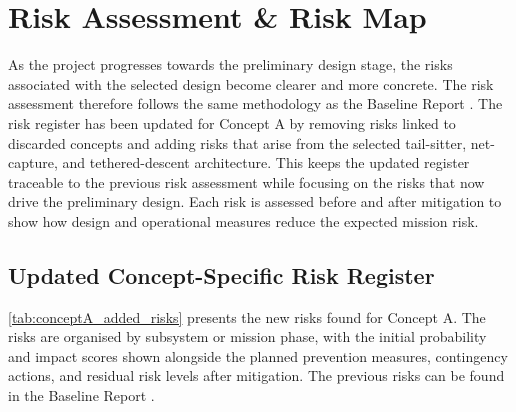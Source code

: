 \chapter{Risk Assessment \& Risk Map}
As the project progresses towards the preliminary design stage, the risks associated with the selected design become clearer and more concrete. The risk assessment therefore follows the same methodology as the Baseline Report \cite{bellona2026baseline}. The risk register has been updated for Concept A by removing risks linked to discarded concepts and adding risks that arise from the selected tail-sitter, net-capture, and tethered-descent architecture. This keeps the updated register traceable to the previous risk assessment while focusing on the risks that now drive the preliminary design. Each risk is assessed before and after mitigation to show how design and operational measures reduce the expected mission risk.
\section{Updated Concept-Specific Risk Register}
\autoref{tab:conceptA_added_risks} presents the new risks found for Concept A. The risks are organised by subsystem or mission phase, with the initial probability and impact scores shown alongside the planned prevention measures, contingency actions, and residual risk levels after mitigation. The previous risks can be found in the Baseline Report \cite{bellona2026baseline}.

\setlength{\LTleft}{0pt}
\setlength{\LTright}{0pt}
\renewcommand{\arraystretch}{1}
\setlength{\tabcolsep}{1.5pt}

